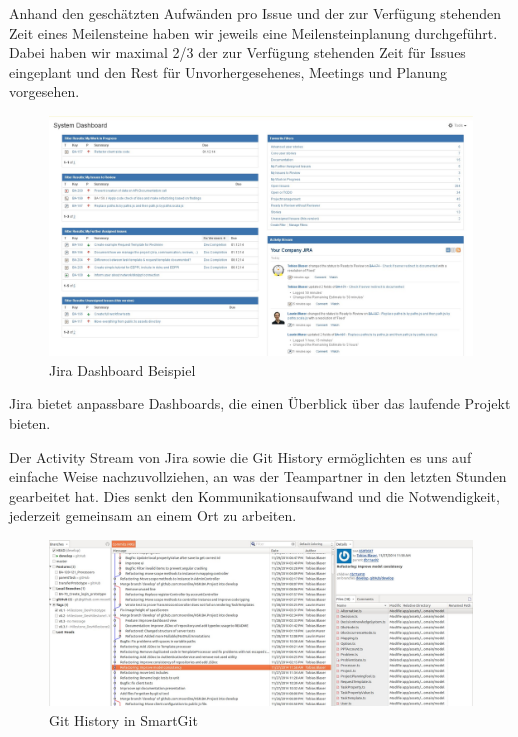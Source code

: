 		Anhand den geschätzten Aufwänden
		pro Issue und der zur Verfügung stehenden Zeit eines Meilensteine haben wir jeweils eine Meilensteinplanung durchgeführt.		
		Dabei haben wir maximal 2/3 der zur Verfügung stehenden Zeit für
		Issues eingeplant und den Rest für Unvorhergesehenes, 
		Meetings und Planung vorgesehen.
		
		\begin{figure}[H]
			\includegraphics[width=\textwidth]{projectPlan/media/img/jiraDashBoard.jpg}
			\centering
			\caption{Jira Dashboard Beispiel}
			\label{fig:jiraDashBoard}
		\end{figure}
		
		Jira bietet anpassbare Dashboards, 
		die einen Überblick über das laufende Projekt bieten.
		
		Der Activity Stream von Jira sowie die Git History ermöglichten es uns auf einfache Weise nachzuvollziehen,
		an was der Teampartner in den letzten Stunden gearbeitet hat. 
		Dies senkt den Kommunikationsaufwand und die Notwendigkeit,
		jederzeit gemeinsam an einem Ort zu arbeiten.
		
		\begin{figure}[H]
			\includegraphics[width=\textwidth]{projectPlan/media/img/gitHistory.jpg}
			\centering
			\caption{Git History in SmartGit}
			\label{fig:gitHistory}
		\end{figure}
		
